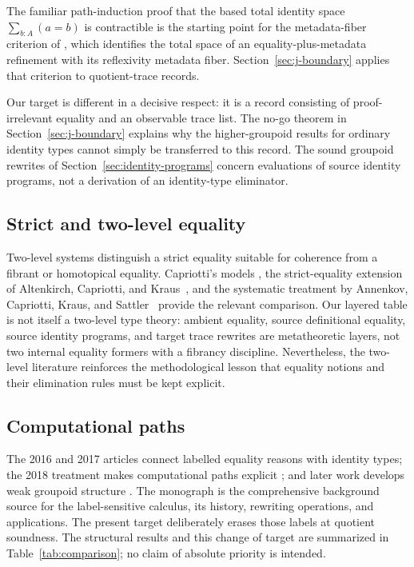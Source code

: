 \documentclass[10pt,reqno]{amsart}
\begin{document}
The familiar path-induction proof that the based total identity space
\(\sum_{b:A}(a=b)\) is contractible \cite{HoTTBook2013} is the starting point
for the metadata-fiber criterion of \cite{ObservableMetadata2026}, which
identifies the total space of an equality-plus-metadata refinement with its
reflexivity metadata fiber.  Section~\ref{sec:j-boundary} applies that
criterion to quotient-trace records.

Our target is different in a decisive respect: it is a record consisting of
proof-irrelevant equality and an observable trace list.  The no-go theorem
in Section~\ref{sec:j-boundary} explains why the higher-groupoid results for
ordinary identity types cannot simply be transferred to this record.  The
sound groupoid rewrites of Section~\ref{sec:identity-programs} concern
evaluations of source identity programs, not a derivation of an
identity-type eliminator.

\subsection{Strict and two-level equality}

Two-level systems distinguish a strict equality suitable for coherence from
a fibrant or homotopical equality.  Capriotti's models
\cite{Capriotti2016}, the strict-equality extension of Altenkirch, Capriotti,
and Kraus~\cite{AltenkirchCapriottiKraus2016}, and the systematic treatment
by Annenkov, Capriotti, Kraus, and Sattler~\cite{AnnenkovEtAl2023} provide
the relevant comparison.  Our layered table is not itself a two-level type
theory: ambient equality, source definitional equality, source identity
programs, and target trace rewrites are metatheoretic layers, not two
internal equality formers with a fibrancy discipline.  Nevertheless, the
two-level literature reinforces the methodological lesson that equality
notions and their elimination rules must be kept explicit.

\subsection{Computational paths}

The 2016 and 2017 articles
\cite{deQueirozEtAl2016,RamosEtAl2017} connect labelled equality reasons
with identity types; the 2018 treatment makes computational paths explicit
\cite{RamosEtAl2018}; and later work develops weak groupoid structure
\cite{deVerasEtAl2025}.  The monograph
\cite{RamosEtAl2026} is the comprehensive background source for the
label-sensitive calculus, its history, rewriting operations, and
applications.  The present target deliberately erases those labels at
quotient soundness.  The structural results and this change of target are
summarized in Table~\ref{tab:comparison}; no claim of absolute priority is
intended.
\end{document}
